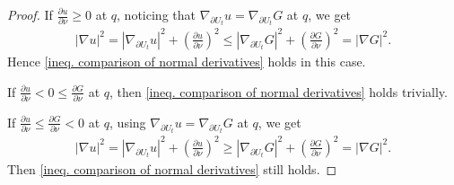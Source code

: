 \documentclass[12pt]{amsart}
\theoremstyle{plain}
\theoremstyle{definition}
\theoremstyle{remark}     %
\begin{document}
\begin{proof}
    If $\frac{\partial u}{\partial\nu}\geq 0$ at $q$, noticing that $\nabla_{\partial U_t}u=\nabla_{\partial U_t}G$ at $q$, we get
    \begin{align*}
        |\nabla u|^2
        =|\nabla_{\partial U_t}u|^2
        +\left(\frac{\partial u}{\partial\nu}\right)^2
        \leq 
        |\nabla_{\partial U_t}G|^2
        +\left(\frac{\partial G}{\partial\nu}\right)^2
        =|\nabla G|^2.
    \end{align*}
    Hence \cref{ineq. comparison of normal derivatives} holds in this case.

    If $\frac{\partial u}{\partial\nu}<0\leq \frac{\partial G}{\partial\nu}$ at $q$, then \cref{ineq. comparison of normal derivatives} holds trivially.

    If $\frac{\partial u}{\partial\nu}
    \leq \frac{\partial G}{\partial\nu}<0$ at $q$, using $\nabla_{\partial U_t}u=\nabla_{\partial U_t}G$ at $q$, we get
    \begin{align*}
        |\nabla u|^2
        =|\nabla_{\partial U_t}u|^2
        +\left(\frac{\partial u}{\partial\nu}\right)^2
        \geq 
        |\nabla_{\partial U_t}G|^2
        +\left(\frac{\partial G}{\partial\nu}\right)^2
        =|\nabla G|^2.
    \end{align*}
    Then \cref{ineq. comparison of normal derivatives} still holds.


\end{proof}
\end{document}
